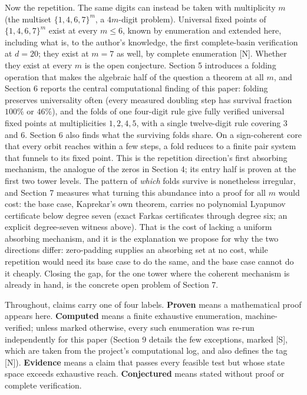 \documentclass[11pt,letterpaper]{article}
\theoremstyle{paperstyle}
\theoremstyle{paperstyledef}
\theoremstyle{paperstylerem}
\begin{document}
Now the repetition. The same digits can instead be taken with multiplicity \(m\) (the multiset \(\{1,4,6,7\}^m\), a \(4m\)-digit problem). Universal fixed points of \(\{1,4,6,7\}^m\) exist at every \(m \leq 6\), known by enumeration and extended here, including what is, to the author's knowledge, the first complete-basin verification at \(d=20\); they exist at \(m = 7\) as well, by complete enumeration {[}N{]}. Whether they exist at every \(m\) is the open conjecture. Section 5 introduces a folding operation that makes the algebraic half of the question a theorem at all \(m\), and Section 6 reports the central computational finding of this paper: folding preserves universality often (every measured doubling step has survival fraction \(100\%\) or \(46\%\)), and the folds of one four-digit rule give fully verified universal fixed points at multiplicities \(1, 2, 4, 5\), with a single twelve-digit rule covering \(3\) and \(6\). Section 6 also finds what the surviving folds share. On a sign-coherent core that every orbit reaches within a few steps, a fold reduces to a finite pair system that funnels to its fixed point. This is the repetition direction's first absorbing mechanism, the analogue of the zeros in Section 4; its entry half is proven at the first two tower levels. The pattern of \emph{which} folds survive is nonetheless irregular, and Section 7 measures what turning this abundance into a proof for all \(m\) would cost: the base case, Kaprekar's own theorem, carries no polynomial Lyapunov certificate below degree seven (exact Farkas certificates through degree six; an explicit degree-seven witness above). That is the cost of lacking a uniform absorbing mechanism, and it is the explanation we propose for why the two directions differ: zero-padding supplies an absorbing set at no cost, while repetition would need its base case to do the same, and the base case cannot do it cheaply. Closing the gap, for the one tower where the coherent mechanism is already in hand, is the concrete open problem of Section 7.

Throughout, claims carry one of four labels. \textbf{Proven} means a mathematical proof appears here. \textbf{Computed} means a finite exhaustive enumeration, machine-verified; unless marked otherwise, every such enumeration was re-run independently for this paper (Section 9 details the few exceptions, marked {[}S{]}, which are taken from the project's computational log, and also defines the tag {[}N{]}). \textbf{Evidence} means a claim that passes every feasible test but whose state space exceeds exhaustive reach. \textbf{Conjectured} means stated without proof or complete verification.
\end{document}
